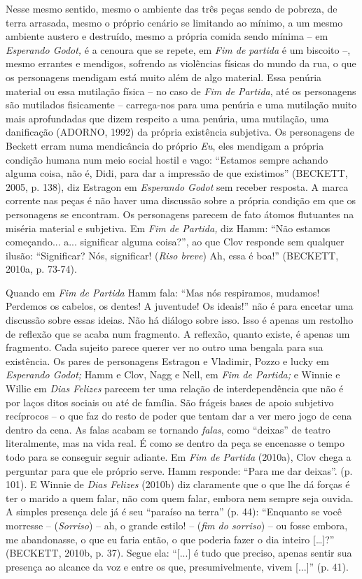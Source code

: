 Nesse mesmo sentido, mesmo o ambiente das três peças sendo de pobreza,
de terra arrasada, mesmo o próprio cenário se limitando ao mínimo, a um
mesmo ambiente austero e destruído, mesmo a própria comida sendo mínima
-- em \emph{Esperando Godot,} é a cenoura que se repete, em \emph{Fim de
partida} é um biscoito --, mesmo errantes e mendigos, sofrendo as
violências físicas do mundo da rua, o que os personagens mendigam está
muito além de algo material. Essa penúria material ou essa mutilação
física -- no caso de \emph{Fim de Partida}, até os personagens são
mutilados fisicamente -- carrega-nos para uma penúria e uma mutilação
muito mais aprofundadas que dizem respeito a uma penúria, uma mutilação,
uma danificação (ADORNO, 1992) da própria existência subjetiva. Os
personagens de Beckett erram numa mendicância do próprio \emph{Eu}, eles
mendigam a própria condição humana num meio social hostil e vago:
``Estamos sempre achando alguma coisa, não é, Didi, para dar a impressão
de que existimos'' (BECKETT, 2005, p. 138), diz Estragon em
\emph{Esperando Godot} sem receber resposta. A marca corrente nas peças
é não haver uma discussão sobre a própria condição em que os personagens
se encontram. Os personagens parecem de fato átomos flutuantes na
miséria material e subjetiva. Em \emph{Fim de Partida,} diz Hamm: ``Não
estamos começando... a... significar alguma coisa?'', ao que Clov
responde sem qualquer ilusão: ``Significar? Nós, significar! (\emph{Riso
breve}) Ah, essa é boa!'' (BECKETT, 2010a, p. 73-74).

Quando em \emph{Fim de Partida} Hamm fala: ``Mas nós respiramos,
mudamos! Perdemos os cabelos, os dentes! A juventude! Os ideais!'' não é
para encetar uma discussão sobre essas ideias. Não há diálogo sobre
isso. Isso é apenas um restolho de reflexão que se acaba num fragmento.
A reflexão, quanto existe, é apenas um fragmento. Cada sujeito parece
querer ver no outro uma bengala para sua existência. Os pares de
personagens Estragon e Vladimir, Pozzo e lucky em \emph{Esperando
Godot;} Hamm e Clov, Nagg e Nell, em \emph{Fim de Partida;} e Winnie e
Willie em \emph{Dias Felizes} parecem ter uma relação de
interdependência que não é por laços ditos sociais ou até de família.
São frágeis bases de apoio subjetivo recíprocos -- o que faz do resto de
poder que tentam dar a ver mero jogo de cena dentro da cena. As falas
acabam se tornando \emph{falas}, como ``deixas'' de teatro literalmente,
mas na vida real. É como se dentro da peça se encenasse o tempo todo
para se conseguir seguir adiante. Em \emph{Fim de Partida} (2010a), Clov
chega a perguntar para que ele próprio serve. Hamm responde: ``Para me
dar deixas''. (p. 101). E Winnie de \emph{Dias Felizes} (2010b) diz
claramente que o que lhe dá forças é ter o marido a quem falar, não com
quem falar, embora nem sempre seja ouvida. A simples presença dele já é
seu ``paraíso na terra'' (p. 44): ``Enquanto se você morresse --
(\emph{Sorriso}) -- ah, o grande estilo! -- (\emph{fim do sorriso}) --
ou fosse embora, me abandonasse, o que eu faria então, o que poderia
fazer o dia inteiro {[}\ldots{}{]}?'' (BECKETT, 2010b, p. 37). Segue
ela: ``{[}...{]} é tudo que preciso, apenas sentir sua presença ao
alcance da voz e entre os que, presumivelmente, vivem {[}...{]}'' (p.
41).

